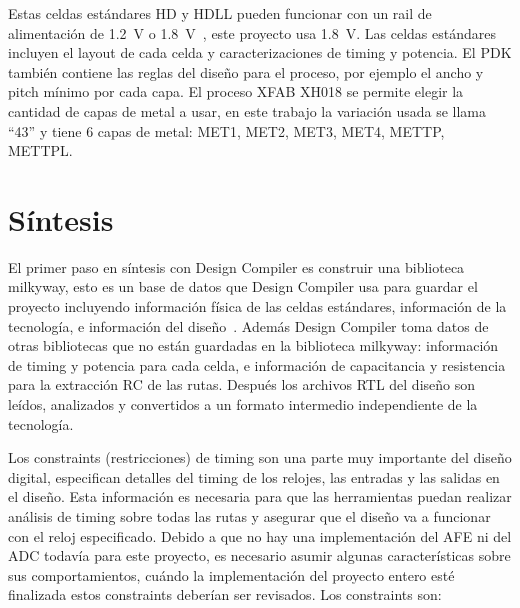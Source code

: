 \documentclass[a4paper, twoside, 11pt]{report}
\begin{document}
Estas celdas estándares HD y HDLL pueden funcionar con un rail de alimentación de \SI{1.2}{\volt} o \SI{1.8}{\volt}~\cite{xfab_dig_libs_overview}, este proyecto usa \SI{1.8}{\volt}. Las celdas estándares incluyen el layout de cada celda y caracterizaciones de timing y potencia. El PDK también contiene las reglas del diseño para el proceso, por ejemplo el ancho y pitch mínimo por cada capa. El proceso XFAB XH018 se permite elegir la cantidad de capas de metal a usar, en este trabajo la variación usada se llama “43” y tiene 6 capas de metal: MET1, MET2, MET3, MET4, METTP, METTPL.

\FloatBarrier
\section{Síntesis}

El primer paso en síntesis con Design Compiler es construir una biblioteca milkyway, esto es un base de datos que Design Compiler usa para guardar el proyecto incluyendo información física de las celdas estándares, información de la tecnología, e información del diseño~\cite{milkyway_database_app_note}. Además Design Compiler toma datos de otras bibliotecas que no están guardadas en la biblioteca milkyway: información de timing y potencia para cada celda, e información de capacitancia y resistencia para la extracción RC de las rutas. Después los archivos RTL del diseño son leídos, analizados y convertidos a un formato intermedio independiente de la tecnología.

Los constraints (restricciones) de timing son una parte muy importante del diseño digital, especifican detalles del timing de los relojes, las entradas y las salidas en el diseño. Esta información es necesaria para que las herramientas puedan realizar análisis de timing sobre todas las rutas y asegurar que el diseño va a funcionar con el reloj especificado. Debido a que no hay una implementación del AFE ni del ADC todavía para este proyecto, es necesario asumir algunas características sobre sus comportamientos, cuándo la implementación del proyecto entero esté finalizada estos constraints deberían ser revisados. Los constraints son:
\end{document}
